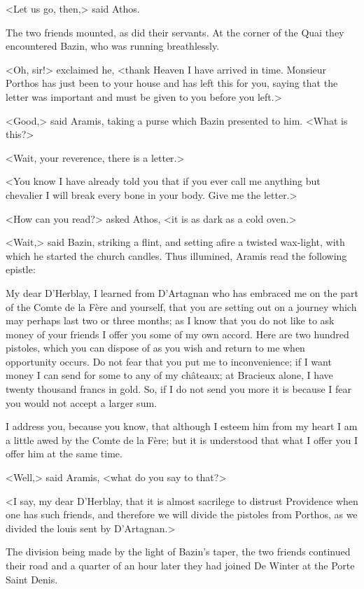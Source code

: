 <Let us go, then,> said Athos.

The two friends mounted, as did their servants. At the corner of the Quai they encountered Bazin, who was running breathlessly.

<Oh, sir!> exclaimed he, <thank Heaven I have arrived in time. Monsieur Porthos has just been to your house and has left this for you, saying that the letter was important and must be given to you before you left.>

<Good,> said Aramis, taking a purse which Bazin presented to him. <What is this?>

<Wait, your reverence, there is a letter.>

<You know I have already told you that if you ever call me anything but chevalier I will break every bone in your body. Give me the letter.>

<How can you read?> asked Athos, <it is as dark as a cold oven.>

<Wait,> said Bazin, striking a flint, and setting afire a twisted wax-light, with which he started the church candles. Thus illumined, Aramis read the following epistle:

\begin{mail}{}{My dear D'Herblay,}
I learned from D'Artagnan who has embraced me on the part of the Comte de la Fère and yourself, that you are setting out on a journey which may perhaps last two or three months; as I know that you do not like to ask money of your friends I offer you some of my own accord. Here are two hundred pistoles, which you can dispose of as you wish and return to me when opportunity occurs. Do not fear that you put me to inconvenience; if I want money I can send for some to any of my châteaux; at Bracieux alone, I have twenty thousand francs in gold. So, if I do not send you more it is because I fear you would not accept a larger sum.

I address you, because you know, that although I esteem him from my heart I am a little awed by the Comte de la Fère; but it is understood that what I offer you I offer him at the same time.

\end{mail}

<Well,> said Aramis, <what do you say to that?>

<I say, my dear D'Herblay, that it is almost sacrilege to distrust Providence when one has such friends, and therefore we will divide the pistoles from Porthos, as we divided the louis sent by D'Artagnan.>

The division being made by the light of Bazin's taper, the two friends continued their road and a quarter of an hour later they had joined De Winter at the Porte Saint Denis.